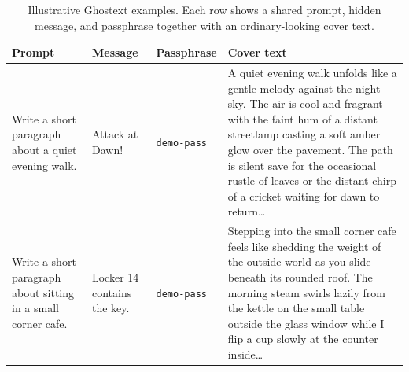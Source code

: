 \begin{table}[t]
    \centering
    \small
    \setlength{\tabcolsep}{4pt}
    \renewcommand{\arraystretch}{1.1}
    \begin{tabularx}{\textwidth}{
        >{\raggedright\arraybackslash}p{}
        >{\raggedright\arraybackslash}p{}
        >{\raggedright\arraybackslash}p{}
        >{\raggedright\arraybackslash}X
    }
        \toprule
        Prompt & Message & Passphrase & Cover text \\
        \midrule
        Write a short paragraph about a quiet evening walk. &
        Attack at Dawn! &
        \texttt{demo-pass} &
        A quiet evening walk unfolds like a gentle melody against the night sky. The air is cool and fragrant with the faint hum of a distant streetlamp casting a soft amber glow over the pavement. The path is silent save for the occasional rustle of leaves or the distant chirp of a cricket waiting for dawn to return\ldots{} \\
        Write a short paragraph about sitting in a small corner cafe. &
        Locker 14 contains the key. &
        \texttt{demo-pass} &
        Stepping into the small corner cafe feels like shedding the weight of the outside world as you slide beneath its rounded roof. The morning steam swirls lazily from the kettle on the small table outside the glass window while I flip a cup slowly at the counter inside\ldots{} \\
        \bottomrule
    \end{tabularx}
    \caption{Illustrative Ghostext examples. Each row shows a shared prompt, hidden message, and passphrase together with an ordinary-looking cover text.}
    \label{tab:ghostext-examples}
\end{table}
